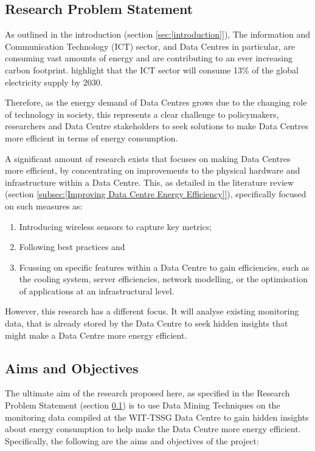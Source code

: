 \documentclass[12pt]{scrartcl}
\begin{document}
\subsection{Research Problem Statement}
\label{subsec:[Research Problem Statement]}
As outlined in the introduction (section \ref{sec:[introduction]}), The information and Communication Technology (ICT) sector, and Data Centres in particular, are consuming vast amounts of energy and are contributing to an ever increasing carbon footprint.  \citet{edsbas.13818AC20170101} highlight that the ICT sector will consume 13\% of the global electricity supply by 2030. 

Therefore, as the energy demand of Data Centres grows due to the changing role of technology in society, this represents a clear challenge to policymakers, researchers and Data Centre stakeholders to seek solutions to make Data Centres more efficient in terms of energy consumption. 

A significant amount of research exists that focuses on making Data Centres more efficient, by concentrating on improvements to the physical hardware and infrastructure within a Data Centre. This, as detailed in the literature review (section \ref{subsec:[Improving Data Centre Energy Efficiency]}), specifically focused on such measures as: 

\begin{enumerate}
\item Introducing wireless sensors to capture key metrics;
\item Following best practices and 
\item Fcussing on specific features within a Data Centre to gain efficiencies, such as the cooling system, server efficiencies, network modelling, or the optimisation of applications at an infrastructural level. 
\end{enumerate}

However, this research has a different focus. It will analyse existing monitoring data, that is already stored by the Data Centre to seek hidden insights that might make a Data Centre more energy efficient. 

\subsection{Aims and Objectives}
\label{subsec:[Aims and Objective]}

The ultimate aim of the research proposed here, as specified in the Research Problem Statement (section \ref{subsec:[Research Problem Statement]}) is to use Data Mining Techniques on the monitoring data compiled at the WIT-TSSG Data Centre to gain hidden insights about energy consumption to help make the Data Centre more energy efficient. 
Specifically, the following are the aims and objectives of the project:
\end{document}
